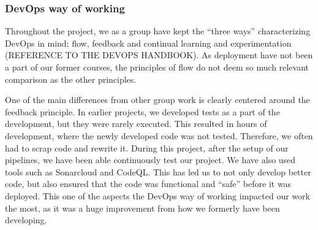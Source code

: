 \subsubsection{DevOps way of working}

Throughout the project, we as a group have kept the “three ways” characterizing DevOps in mind; flow, feedback and continual learning and experimentation (REFERENCE TO THE DEVOPS HANDBOOK). As deployment have not been a part of our former courses, the principles of flow do not deem so much relevant comparison as the other principles.

One of the main differences from other group work is clearly centered around the feedback principle. In earlier projects, we developed tests as a part of the development, but they were rarely executed. This resulted in hours of development, where the newly developed code was not tested. Therefore, we often had to scrap code and rewrite it. During this project, after the setup of our pipelines, we have been able continuously test our project. We have also used tools such as Sonarcloud and CodeQL. This has led us to not only develop better code, but also ensured that the code was functional and “safe” before it was deployed. This one of the aspects the DevOps way of working impacted our work the most, as it was a huge improvement from how we formerly have been developing.